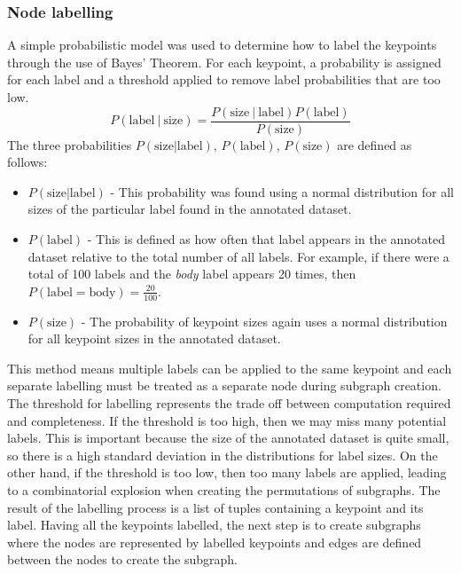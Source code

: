 \subsubsection{Node labelling}\label{sec:probabilistic-model}
A simple probabilistic model was used to determine how to label the keypoints through the use of Bayes' Theorem. For each keypoint, a probability is assigned for each label and a threshold applied to remove label probabilities that are too low.
\begin{equation}\label{eq:bayes-labelling}
P(\text{label}\ |\ \text{size}) = \frac{P(\text{size}\ |\ \text{label}) P(\text{label})} {P(\text{size})}
\end{equation}
The three probabilities $P(\text{size} | \text{label})$, $P(\text{label})$, $P(\text{size})$ are defined as follows:
\begin{itemize}
\item $P(\text{size} | \text{label})$ - This probability was found using a normal distribution for all sizes of the particular label found in the annotated dataset.
\item $P(\text{label})$ - This is defined as how often that label appears in the annotated dataset relative to the total number of all labels. For example, if there were a total of 100 labels and the \textit{body} label appears 20 times, then $P(\text{label} = \text{body}) = \frac{20}{100}$.
\item $P(\text{size})$ - The probability of keypoint sizes again uses a normal distribution for all keypoint sizes in the annotated dataset.
\end{itemize}
This method means multiple labels can be applied to the same keypoint and each separate labelling must be treated as a separate node during subgraph creation. The threshold for labelling represents the trade off between computation required and completeness. If the threshold is too high, then we may miss many potential labels. This is important because the size of the annotated dataset is quite small, so there is a high standard deviation in the distributions for label sizes. On the other hand, if the threshold is too low, then too many labels are applied, leading to a combinatorial explosion when creating the permutations of subgraphs. The result of the labelling process is a list of tuples containing a keypoint and its label. Having all the keypoints labelled, the next step is to create subgraphs where the nodes are represented by labelled keypoints and edges are defined  between the nodes to create the subgraph. 

